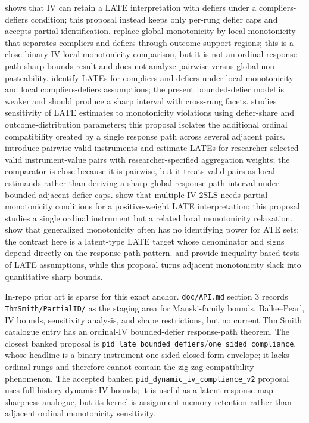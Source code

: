 \documentclass[11pt]{article}
\theoremstyle{definition}
\theoremstyle{plain}
\theoremstyle{remark}
\begin{document}
\citet{deChaisemartin2017} shows that IV can retain a LATE interpretation with defiers under a compliers-defiers condition; this proposal instead keeps only per-rung defier caps and accepts partial identification.  \citet{HuberMellace2012} replace global monotonicity by local monotonicity that separates compliers and defiers through outcome-support regions; this is a close binary-IV local-monotonicity comparison, but it is not an ordinal response-path sharp-bounds result and does not analyze pairwise-versus-global non-pasteability.  \citet{DahlHuberMellace2023} identify LATEs for compliers and defiers under local monotonicity and local compliers-defiers assumptions; the present bounded-defier model is weaker and should produce a sharp interval with cross-rung facets.  \citet{Noack2021} studies sensitivity of LATE estimates to monotonicity violations using defier-share and outcome-distribution parameters; this proposal isolates the additional ordinal compatibility created by a single response path across several adjacent pairs.  \citet{SunWuthrich2025} introduce pairwise valid instruments and estimate LATEs for researcher-selected valid instrument-value pairs with researcher-specified aggregation weights; the comparator is close because it is pairwise, but it treats valid pairs as local estimands rather than deriving a sharp global response-path interval under bounded adjacent defier caps.  \citet{MogstadTorgovitskyWalters2021} show that multiple-IV 2SLS needs partial monotonicity conditions for a positive-weight LATE interpretation; this proposal studies a single ordinal instrument but a related local monotonicity relaxation.  \citet{BaiHuangMoonShaikhVytlacil2024} show that generalized monotonicity often has no identifying power for ATE sets; the contrast here is a latent-type LATE target whose denominator and signs depend directly on the response-path pattern.  \citet{HuberMellace2015} and \citet{Kitagawa2015} provide inequality-based tests of LATE assumptions, while this proposal turns adjacent monotonicity slack into quantitative sharp bounds.

In-repo prior art is sparse for this exact anchor.  \texttt{doc/API.md} section 3 records \texttt{ThmSmith/PartialID/} as the staging area for Manski-family bounds, Balke--Pearl, IV bounds, sensitivity analysis, and shape restrictions, but no current ThmSmith catalogue entry has an ordinal-IV bounded-defier response-path theorem.  The closest banked proposal is \texttt{pid\_late\_bounded\_defiers}/\texttt{one\_sided\_compliance}, whose headline is a binary-instrument one-sided closed-form envelope; it lacks ordinal rungs and therefore cannot contain the zig-zag compatibility phenomenon.  The accepted banked \texttt{pid\_dynamic\_iv\_compliance\_v2} proposal uses full-history dynamic IV bounds; it is useful as a latent response-map sharpness analogue, but its kernel is assignment-memory retention rather than adjacent ordinal monotonicity sensitivity.
\end{document}
